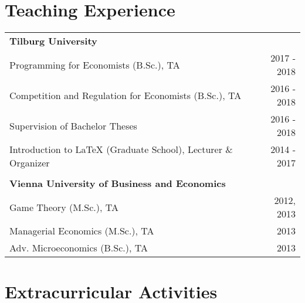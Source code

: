 \documentclass[a4paper,10pt]{article} %
\begin{document}
\section{Teaching Experience}
\begin{tabular}{p{12cm} r}

\textbf{Tilburg University}\\
\hspace{0.5cm}Programming for Economists (B.Sc.), TA & 2017 - 2018\\
\hspace{0.5cm}Competition and Regulation for Economists (B.Sc.), TA  & 2016 - 2018\\
\hspace{0.5cm}Supervision of Bachelor Theses & 2016 - 2018 \\
\hspace{0.5cm}Introduction to LaTeX (Graduate School), Lecturer \& Organizer & 2014 - 2017 \\
\multicolumn{2}{c}{} \\

\textbf{Vienna University of Business and Economics}\\
\hspace{0.5cm}Game Theory (M.Sc.), TA &2012, 2013\\
\hspace{0.5cm}Managerial Economics (M.Sc.), TA &2013\\
\hspace{0.5cm}Adv. Microeconomics (B.Sc.), TA &2013\\
\end{tabular}

\newpage
\section{Extracurricular Activities }
\end{document}

